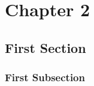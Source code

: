 \chapter{Chapter 2}
\chaptermark{  }
\label{chapter_2}


\section{First Section}
\lipsum[1]

\subsection{First Subsection}
\lipsum[1]




\cleardoublepage